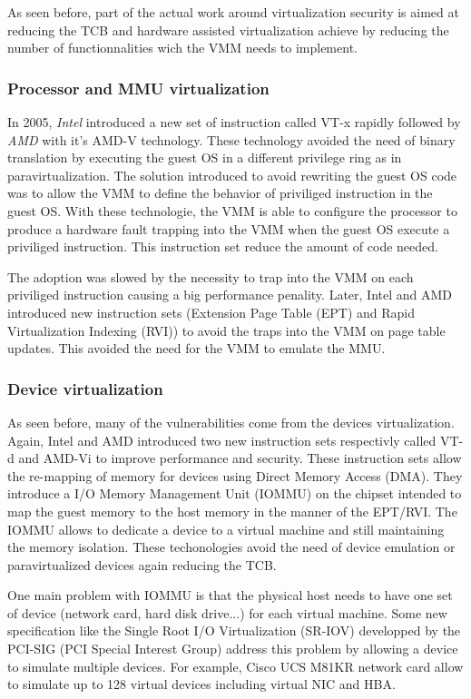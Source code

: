 As seen before, part of the actual work around virtualization security is aimed at
reducing the TCB and hardware assisted virtualization achieve by reducing the
number of functionnalities wich the VMM needs to implement.

\subsubsection{Processor and MMU virtualization}
In 2005, \emph{Intel} introduced a new set of instruction called VT-x rapidly
followed by \emph{AMD} with it's AMD-V technology.
These technology avoided the need of binary translation by executing the guest
OS in a different privilege ring as in paravirtualization.
The solution introduced to avoid rewriting the guest OS code was to allow the
VMM to define the behavior of priviliged instruction in the guest OS.
With these technologie, the VMM is able to configure the processor to produce a
hardware fault trapping into the VMM when the guest OS execute a priviliged
instruction.
This instruction set reduce the amount of code needed.

The adoption was slowed by the necessity to trap into the VMM on each priviliged
instruction causing a big performance penality.
Later, Intel and AMD introduced new instruction sets (Extension Page Table (EPT) and
Rapid Virtualization Indexing (RVI)) to avoid the traps into the VMM on page table
updates.
This avoided the need for the VMM to emulate the MMU.

\subsubsection{Device virtualization}
As seen before, many of the vulnerabilities come from the devices
virtualization.
Again, Intel and AMD introduced two new instruction sets respectivly called
VT-d and AMD-Vi to improve performance and security.
These instruction sets allow the re-mapping of memory for devices using Direct
Memory Access (DMA).
They introduce a I/O Memory Management Unit (IOMMU) on the chipset intended to
map the guest memory to the host memory in the manner of the EPT/RVI.
The IOMMU allows to dedicate a device to a virtual machine and still maintaining the
memory isolation.
These techonologies avoid the need of device emulation or paravirtualized
devices again reducing the TCB.

One main problem with IOMMU is that the physical host needs to have one
set of device (network card, hard disk drive...) for each virtual machine.
Some new specification like the Single Root I/O Virtualization (SR-IOV)
developped by the PCI-SIG (PCI Special Interest Group)
address this problem by allowing a device to simulate multiple devices.
For example, Cisco UCS M81KR network card allow to simulate up to 128 virtual
devices including virtual NIC and HBA.

